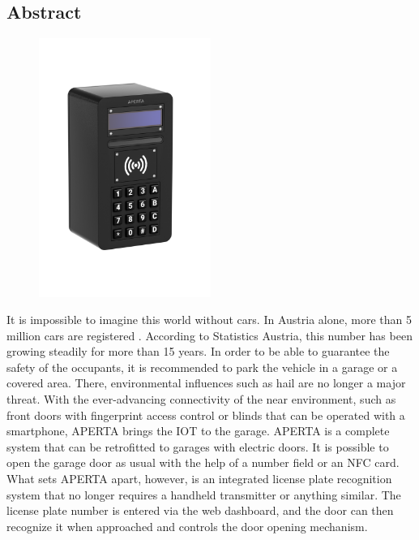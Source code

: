 \begin{spacing}{1}
    \chapter*{Abstract}
\end{spacing}
\begin{figure}
    \begin{center}
      \includegraphics[width=0.5\textwidth]{pics/all-in-package.png}
    \end{center}
\end{figure}
It is impossible to imagine this world without cars. In Austria alone, more than 5 million cars are registered \cite{StatAustPKW}. According to Statistics Austria, this number has been growing steadily for more than 15 years. In order to be able to guarantee the safety of the occupants, it is recommended to park the vehicle in a garage or a covered area. There, environmental influences such as hail are no longer a major threat.
With the ever-advancing connectivity of the near environment, such as front doors with fingerprint access control or blinds that can be operated with a smartphone, APERTA brings the IOT to the garage.
APERTA is a complete system that can be retrofitted to garages with electric doors. It is possible to open the garage door as usual with the help of a number field or an NFC card. What sets APERTA apart, however, is an integrated license plate recognition system that no longer requires a handheld transmitter or anything similar. The license plate number is entered via the web dashboard, and the door can then recognize it when approached and controls the door opening mechanism.

